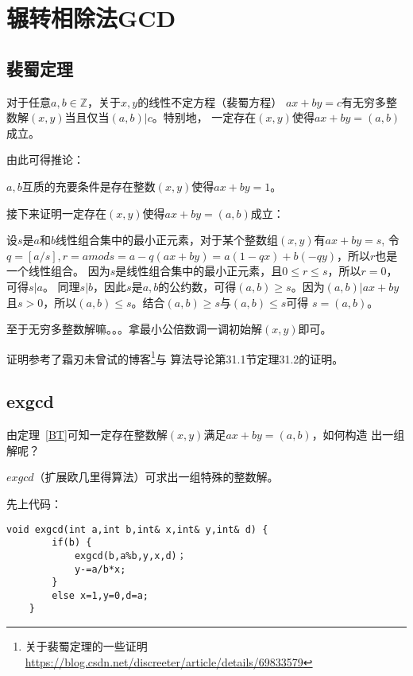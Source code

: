\section{辗转相除法GCD}
\subsection{裴蜀定理}
\begin{theorem}\label{BT}
    对于任意$a,b\in \mathbb{Z}$，关于$x,y$的线性不定方程（裴蜀方程）
    $ax+by=c$有无穷多整数解$(x,y)$当且仅当$(a,b)|c$。特别地，
    一定存在$(x,y)$使得$ax+by=(a,b)$成立。
\end{theorem}

由此可得推论：

\begin{inference}
    $a,b$互质的充要条件是存在整数$(x,y)$使得$ax+by=1$。
\end{inference}

接下来证明一定存在$(x,y)$使得$ax+by=(a,b)$成立：

设$s$是$a$和$b$线性组合集中的最小正元素，对于某个整数组$(x,y)$有$ax+by=s$,
令$q=[a/s],r=a mod s=a-q(ax+by)=a(1-qx)+b(-qy)$，所以$r$也是一个线性组合。
因为$s$是线性组合集中的最小正元素，且$0\leq r \le s$，所以$r=0$，可得$s|a$。
同理$s|b$，因此$s$是$a,b$的公约数，可得$(a,b) \geq s$。因为$(a,b)|ax+by$
且$s>0$，所以$(a,b) \leq s$。结合$(a,b) \geq s$与$(a,b) \leq s$可得
$s=(a,b)$。

至于无穷多整数解嘛。。。拿最小公倍数调一调初始解$(x,y)$即可。

证明参考了霜刃未曾试的博客\footnote{关于裴蜀定理的一些证明\\
\url{https://blog.csdn.net/discreeter/article/details/69833579}}与
算法导论\cite{ITA3}第31.1节定理31.2的证明。
\subsection{exgcd}
由定理~\ref{BT}可知一定存在整数解$(x,y)$满足$ax+by=(a,b)$，如何构造
出一组解呢？

$exgcd$（扩展欧几里得算法）可求出一组特殊的整数解。

先上代码：

\begin{lstlisting}[title=exgcd]
    void exgcd(int a,int b,int& x,int& y,int& d) {
        if(b) {
            exgcd(b,a%b,y,x,d)；
            y-=a/b*x;
        }
        else x=1,y=0,d=a;
    }
\end{lstlisting}

